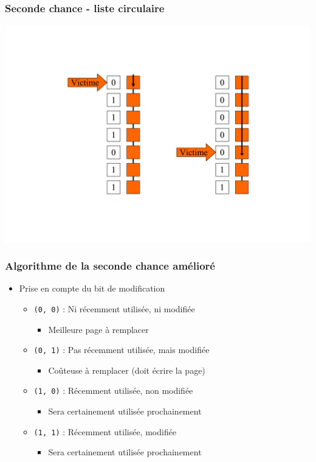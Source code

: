 \begin{frame}
\frametitle{Seconde chance - liste circulaire}
\includegraphics[width=.8\textwidth]{../illustration/remplacement_seconde_chance_liste.pdf}
\end{frame}

\begin{frame}
\frametitle{Algorithme de la seconde chance amélioré}
\begin{itemize}
\item Prise en compte du bit de modification
\begin{itemize}
\item \texttt{(0, 0)} : Ni récemment utilisée, ni modifiée
\begin{itemize}
\item Meilleure page à remplacer
\end{itemize}
\item \texttt{(0, 1)} : Pas récemment utilisée, mais modifiée
\begin{itemize}
\item Coûteuse à remplacer (doit écrire la page)
\end{itemize}
\item \texttt{(1, 0)} : Récemment utilisée, non modifiée
\begin{itemize}
\item Sera certainement utilisée prochainement
\end{itemize}
\item \texttt{(1, 1)} : Récemment utilisée, modifiée
\begin{itemize}
\item Sera certainement utilisée prochainement
\end{itemize}
\end{itemize}
\end{itemize}
\end{frame}


